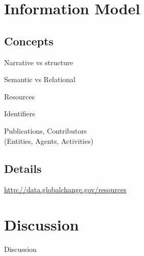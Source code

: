 \documentclass{beamer}
\begin{document}

\section{Information Model}
\subsection{Concepts}
\begin{frame}
    \begin{center}
        \Huge Narrative vs structure
    \end{center}
\end{frame}

\begin{frame}
    \begin{center}
        \Huge Semantic vs Relational
    \end{center}
\end{frame}

\begin{frame}
    \begin{center}
        \Huge Resources
    \end{center}
\end{frame}

\begin{frame}
    \begin{center}
        \Huge Identifiers
    \end{center}
\end{frame}

\begin{frame}
    \begin{center}
        \Huge Publications, Contributors\\
        (Entities, Agents, Activities)
    \end{center}
\end{frame}

\subsection{Details}
\begin{frame}
    \begin{center}
        \url{http://data.globalchange.gov/resources}
    \end{center}
\end{frame}

\section{Discussion}
\begin{frame}
    \begin{center}
        Discussion
    \end{center}
\end{frame}
\end{document}
